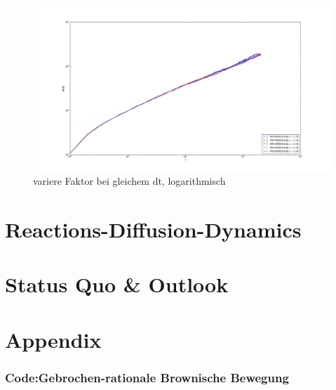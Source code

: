 \documentclass[
  a4paper,BCOR10mm,oneside,
  bibtotoc,idxtotoc,
  headsepline,footsepline,%
  fleqn,openbib
]{scrbook}
\begin{document}
\begin{figure}[h]
\includegraphics[width=\textwidth]{./faktor_variert_bei_dt_1_log.pdf}
\caption{variere Faktor bei gleichem dt, logarithmisch}
 \centering
\end{figure}

\chapter{Reactions-Diffusion-Dynamics}
\chapter{Status Quo \& Outlook}
\chapter{Appendix}
\subsection{Code:Gebrochen-rationale Brownische Bewegung}


\nocite{}



\end{document}
